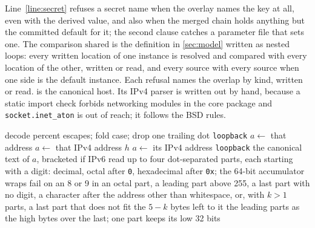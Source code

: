 \documentclass[11pt]{article}
\theoremstyle{plain}
\theoremstyle{definition}
\theoremstyle{remark}
\newcommand{\shared}{\mathrm{shared}}
\begin{document}
Line~\ref{line:secret} refuses a secret name when the overlay names the key at all, even with the derived value,
and also when the merged chain holds anything but the committed default for it; the second clause
catches a parameter file that sets one. The comparison $\shared$ is the definition in
\cref{sec:model} written as nested loops: every written location of one instance is resolved and
compared with every location of the other, written or read, and every source with every source when
one side is the default instance. Each refusal names the overlap by kind, written or read.  is the canonical host. Its IPv4 parser
is written out by hand, because a static import check forbids networking modules in the core
package and \texttt{socket.inet\_aton} is out of reach; it follows the BSD rules.

\begin{algorithm}[t]
\caption{The host a secrets-server address reaches.}\label{alg:host}
\begin{algorithmic}[1]
 
\State decode percent escapes; fold case; drop one trailing dot
 \Return \texttt{loopback}
\EndIf
{} $a \gets$ that address
 $a \gets$ that IPv4 address
\Else{} \Return $h$
\EndIf
{} $a \gets$ its IPv4 address \EndIf
{} \Return \texttt{loopback} \EndIf
\State \Return the canonical text of $a$, bracketed if IPv6
\EndFunction
\Statex
{} 
\State read up to four dot-separated parts, each starting with a digit: decimal, octal after
  \texttt{0}, hexadecimal after \texttt{0x}; the 64-bit accumulator wraps
\State fail on an 8 or 9 in an octal part, a leading part above 255, a last part with no digit, a
  character after the address other than whitespace, or, with $k > 1$ parts, a last part that
  does not fit the $5 - k$ bytes left to it
\State \Return the leading parts as the high bytes over the last; one part keeps its low 32 bits
\EndFunction
\end{algorithmic}
\end{algorithm}
\end{document}

